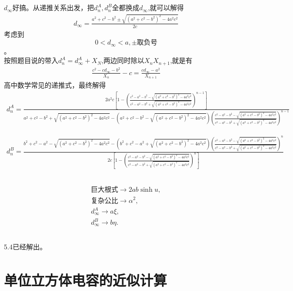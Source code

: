 \documentclass{article}
\begin{document}
\subsection{}
$d_\infty$好搞。从递推关系出发，把$d_n^A,d_n^B$全都换成$d_\infty$,就可以解得
\begin{align}
    \boxed{d_\infty =\frac{a^2+c^2-b^2\pm \sqrt{(a^2+c^2-b^2)^2-4a^2c^2}}{2c}}
\end{align}
考虑到$$0<d_\infty<a,\pm\text{取负号}$$。\\
按照题目说的带入$d^A_n=d^A_{\infty}+X_N$,两边同时除以$X_nX_{n+1}$,就是有
\begin{align}
    \frac{c^2-cd_\infty-b^2}{X_n}-c=\frac{cd_\infty-a^2}{X_{n+1}}
\end{align}
高中数学常见的递推式，最终解得\begin{align}
\boxed{
d_n^A=
\frac{
2a^2c\left[
1-
\left(
\frac{
c^2-a^2-b^2-\sqrt{(a^2+c^2-b^2)^2-4a^2c^2}
}{
c^2-a^2-b^2+\sqrt{(a^2+c^2-b^2)^2-4a^2c^2}
}
\right)^{n-1}
\right]
}{
a^2+c^2-b^2+\sqrt{(a^2+c^2-b^2)^2-4a^2c^2}
-
\left(
a^2+c^2-b^2-\sqrt{(a^2+c^2-b^2)^2-4a^2c^2}
\right)
\left(
\frac{
c^2-a^2-b^2-\sqrt{(a^2+c^2-b^2)^2-4a^2c^2}
}{
c^2-a^2-b^2+\sqrt{(a^2+c^2-b^2)^2-4a^2c^2}
}
\right)^{n-1}
}
}
\end{align}

\begin{align}
\boxed{
d_n^B=
\frac{
b^2+c^2-a^2-\sqrt{(a^2+c^2-b^2)^2-4a^2c^2}
-
\left(
b^2+c^2-a^2+\sqrt{(a^2+c^2-b^2)^2-4a^2c^2}
\right)
\left(
\frac{
c^2-a^2-b^2-\sqrt{(a^2+c^2-b^2)^2-4a^2c^2}
}{
c^2-a^2-b^2+\sqrt{(a^2+c^2-b^2)^2-4a^2c^2}
}
\right)^n
}{
2c\left[
1-
\left(
\frac{
c^2-a^2-b^2-\sqrt{(a^2+c^2-b^2)^2-4a^2c^2}
}{
c^2-a^2-b^2+\sqrt{(a^2+c^2-b^2)^2-4a^2c^2}
}
\right)^n
\right]
}
}
\end{align}
\subsection{}
\begin{align}
\text{巨大根式} \longrightarrow 2ab \sinh u, \\
\text{复杂公比} \longrightarrow \alpha^2, \\
d_\infty^A \longrightarrow a\xi, \\
d_\infty^B \longrightarrow b\eta.
\end{align}
\subsection{}5.4已经解出。
\section{单位立方体电容的近似计算}
\end{document}
